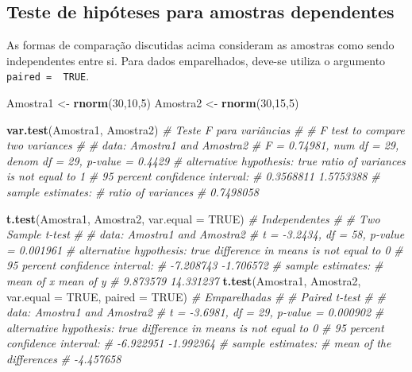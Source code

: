 \documentclass[
]{book}
\newenvironment{Shaded}{\begin{snugshade}}{\end{snugshade}}
\newcommand{\CommentTok}[1]{\textcolor[rgb]{0.56,0.35,0.01}{\textit{#1}}}
\newcommand{\DataTypeTok}[1]{\textcolor[rgb]{0.13,0.29,0.53}{#1}}
\newcommand{\DecValTok}[1]{\textcolor[rgb]{0.00,0.00,0.81}{#1}}
\newcommand{\KeywordTok}[1]{\textcolor[rgb]{0.13,0.29,0.53}{\textbf{#1}}}
\newcommand{\NormalTok}[1]{#1}
\newcommand{\OtherTok}[1]{\textcolor[rgb]{0.56,0.35,0.01}{#1}}
\newcommand{\StringTok}[1]{\textcolor[rgb]{0.31,0.60,0.02}{#1}}
\begin{document}
\hypertarget{teste-de-hipuxf3teses-para-amostras-dependentes}{%
\subsection{Teste de hipóteses para amostras dependentes}\label{teste-de-hipuxf3teses-para-amostras-dependentes}}

As formas de comparação discutidas acima consideram as amostras como sendo independentes entre si. Para dados emparelhados, deve-se utiliza o argumento \texttt{paired\ =\ \ TRUE}.

\begin{Shaded}
\begin{Highlighting}[]
\NormalTok{Amostra1 <-}\StringTok{ }\KeywordTok{rnorm}\NormalTok{(}\DecValTok{30}\NormalTok{,}\DecValTok{10}\NormalTok{,}\DecValTok{5}\NormalTok{)}
\NormalTok{Amostra2 <-}\StringTok{ }\KeywordTok{rnorm}\NormalTok{(}\DecValTok{30}\NormalTok{,}\DecValTok{15}\NormalTok{,}\DecValTok{5}\NormalTok{)}

\KeywordTok{var.test}\NormalTok{(Amostra1, Amostra2) }\CommentTok{# Teste F para variâncias}
\CommentTok{# }
\CommentTok{# 	F test to compare two variances}
\CommentTok{# }
\CommentTok{# data:  Amostra1 and Amostra2}
\CommentTok{# F = 0.74981, num df = 29, denom df = 29, p-value = 0.4429}
\CommentTok{# alternative hypothesis: true ratio of variances is not equal to 1}
\CommentTok{# 95 percent confidence interval:}
\CommentTok{#  0.3568811 1.5753388}
\CommentTok{# sample estimates:}
\CommentTok{# ratio of variances }
\CommentTok{#          0.7498058}

\KeywordTok{t.test}\NormalTok{(Amostra1, Amostra2, }\DataTypeTok{var.equal =} \OtherTok{TRUE}\NormalTok{) }\CommentTok{# Independentes}
\CommentTok{# }
\CommentTok{# 	Two Sample t-test}
\CommentTok{# }
\CommentTok{# data:  Amostra1 and Amostra2}
\CommentTok{# t = -3.2434, df = 58, p-value = 0.001961}
\CommentTok{# alternative hypothesis: true difference in means is not equal to 0}
\CommentTok{# 95 percent confidence interval:}
\CommentTok{#  -7.208743 -1.706572}
\CommentTok{# sample estimates:}
\CommentTok{# mean of x mean of y }
\CommentTok{#  9.873579 14.331237}
\KeywordTok{t.test}\NormalTok{(Amostra1, Amostra2, }\DataTypeTok{var.equal =} \OtherTok{TRUE}\NormalTok{, }\DataTypeTok{paired =} \OtherTok{TRUE}\NormalTok{) }\CommentTok{# Emparelhadas}
\CommentTok{# }
\CommentTok{# 	Paired t-test}
\CommentTok{# }
\CommentTok{# data:  Amostra1 and Amostra2}
\CommentTok{# t = -3.6981, df = 29, p-value = 0.000902}
\CommentTok{# alternative hypothesis: true difference in means is not equal to 0}
\CommentTok{# 95 percent confidence interval:}
\CommentTok{#  -6.922951 -1.992364}
\CommentTok{# sample estimates:}
\CommentTok{# mean of the differences }
\CommentTok{#               -4.457658}
\end{Highlighting}
\end{Shaded}
\end{document}

